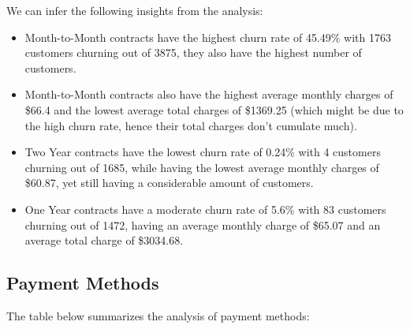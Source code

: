 \documentclass{article}
\theoremstyle{mytheoremstyle}
\theoremstyle{mytheoremstyle}
\theoremstyle{myproblemstyle}
\begin{document}
We can infer the following insights from the analysis:
\begin{itemize}
    \item Month-to-Month contracts have the highest churn rate of 45.49\% with 1763 customers churning out of 3875, they also have the highest number of customers.
    \item Month-to-Month contracts also have the highest average monthly charges of \$66.4 and the lowest average total charges of \$1369.25 (which might be due to the high churn rate, hence their total charges don't cumulate much).
    \item Two Year contracts have the lowest churn rate of 0.24\% with 4 customers churning out of 1685, while having the lowest average monthly charges of \$60.87, yet still having a considerable amount of customers.
    \item One Year contracts have a moderate churn rate of 5.6\% with 83 customers churning out of 1472, having an average monthly charge of \$65.07 and an average total charge of \$3034.68.
\end{itemize}


\subsection{Payment Methods}
The table below summarizes the analysis of payment methods:
\end{document}
